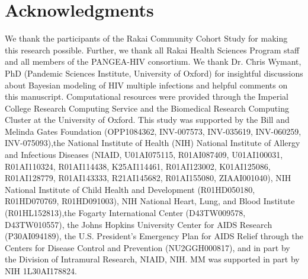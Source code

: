 \documentclass[10pt,letterpaper]{article}
\begin{document}
\section*{Acknowledgments}
We thank the participants of the Rakai Community Cohort Study for making this research possible. Further, we thank all Rakai Health Sciences Program staff and all members of the PANGEA-HIV consortium. We thank Dr. Chris Wymant, PhD (Pandemic Sciences Institute, University of Oxford) for insightful discussions about Bayesian modeling of HIV multiple infections and helpful comments on this manuscript. Computational resources were provided through the Imperial College Research Computing Service and the Biomedical Research Computing Cluster at the University of Oxford. This study was supported by the Bill and Melinda Gates Foundation (OPP1084362, INV-007573, INV-035619, INV-060259, INV-075093),the National Institute of Health (NIH) National Institute of Allergy and Infectious Diseases (NIAID, U01AI075115, R01AI087409, U01AI100031, R01AI110324, R01AI114438, K25AI114461, R01AI123002, K01AI125086, R01AI128779, R01AI143333, R21AI145682, R01AI155080, ZIAAI001040), NIH National Institute of Child Health and Development (R01HD050180, R01HD070769, R01HD091003), NIH National Heart, Lung, and Blood Institute (R01HL152813),the Fogarty International Center (D43TW009578, D43TW010557), the Johns Hopkins University Center for AIDS Research (P30AI094189), the U.S. President’s Emergency Plan for AIDS Relief through the Centers for Disease Control and Prevention (NU2GGH000817), and in part by the Division of Intramural Research, NIAID, NIH. MM was supported in part by NIH 1L30AI178824.  

\newpage
\end{document}
